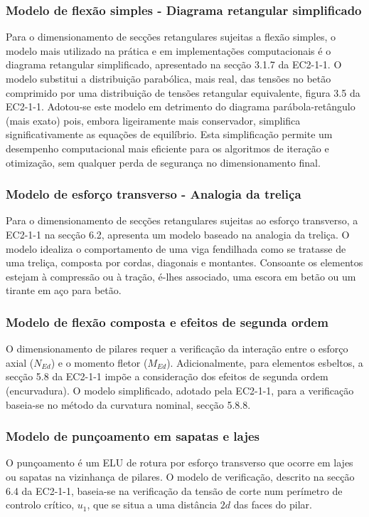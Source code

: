 \subsubsection{Modelo de flexão simples - Diagrama retangular simplificado}
Para o dimensionamento de secções retangulares sujeitas a flexão simples, o modelo mais utilizado na prática e em implementações computacionais é o diagrama retangular simplificado, apresentado na secção 3.1.7 da EC2-1-1. O modelo substitui a distribuição parabólica, mais real, das tensões no betão comprimido por uma distribuição de tensões retangular equivalente, figura 3.5 da EC2-1-1.
Adotou-se este modelo em detrimento do diagrama parábola-retângulo (mais exato) pois, embora ligeiramente mais conservador, simplifica significativamente as equações de equilíbrio. Esta simplificação permite um desempenho computacional mais eficiente para os algoritmos de iteração e otimização, sem qualquer perda de segurança no dimensionamento final.

\subsubsection{Modelo de esforço transverso - Analogia da treliça}
Para o dimensionamento de secções retangulares sujeitas ao esforço transverso, a EC2-1-1 na secção 6.2, apresenta um modelo baseado na analogia da treliça. O modelo idealiza o comportamento de uma viga fendilhada como se tratasse de uma treliça, composta por cordas, diagonais e montantes. Consoante os elementos estejam à compressão ou à tração, é-lhes associado, uma escora em betão ou um tirante em aço para betão.

\subsubsection{Modelo de flexão composta e efeitos de segunda ordem}
O dimensionamento de pilares requer a verificação da interação entre o esforço axial ($N_{Ed}$) e o momento fletor ($M_{Ed}$). Adicionalmente, para elementos esbeltos, a secção 5.8 da EC2-1-1 impõe a consideração dos efeitos de segunda ordem (encurvadura). O modelo simplificado, adotado pela EC2-1-1, para a verificação baseia-se no método da curvatura nominal, secção 5.8.8.

\subsubsection{Modelo de punçoamento em sapatas e lajes}
O punçoamento é um ELU de rotura por esforço transverso que ocorre em lajes ou sapatas na vizinhança de pilares. O modelo de verificação, descrito na secção 6.4 da EC2-1-1, baseia-se na verificação da tensão de corte num perímetro de controlo crítico, $u_1$, que se situa a uma distância $2d$ das faces do pilar.


